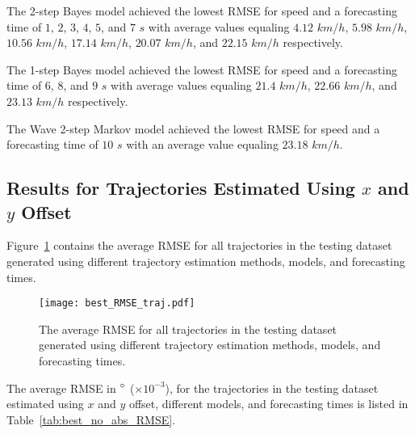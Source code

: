 \documentclass[preprint,12pt]{elsarticle}
\begin{document}
The 2-step Bayes model achieved the lowest RMSE for speed and a forecasting time of $1$, $2$, $3$, $4$, $5$, and $7$ $s$ with average values equaling $4.12$ $km/h$, $5.98$ $km/h$, $10.56$ $km/h$, $17.14$ $km/h$, $20.07$ $km/h$, and $22.15$ $km/h$ respectively.

The 1-step Bayes model achieved the lowest RMSE for speed and a forecasting time of $6$, $8$, and $9$ $s$ with average values equaling $21.4$ $km/h$, $22.66$ $km/h$, and $23.13$ $km/h$ respectively.

The Wave 2-step Markov model achieved the lowest RMSE for speed and a forecasting time of $10$ $s$ with an average value equaling $23.18$ $km/h$.

\subsection{Results for Trajectories Estimated Using $x$ and $y$ Offset}

Figure~\ref{fig:best_RMSE_traj} contains the average RMSE for all trajectories in the testing dataset generated using different trajectory estimation methods, models, and forecasting times.

\begin{figure}[!ht]
	\centering
	\texttt{[image: best\_RMSE\_traj.pdf]}
	\caption{The average RMSE for all trajectories in the testing dataset generated using different trajectory estimation methods, models, and forecasting times.}
	\label{fig:best_RMSE_traj}
\end{figure}

The average RMSE in $\degree$ ($\times 10^{-3}$), for the trajectories in the testing dataset estimated using $x$ and $y$ offset, different models, and forecasting times is listed in Table~\ref{tab:best_no_abs_RMSE}.
\end{document}
